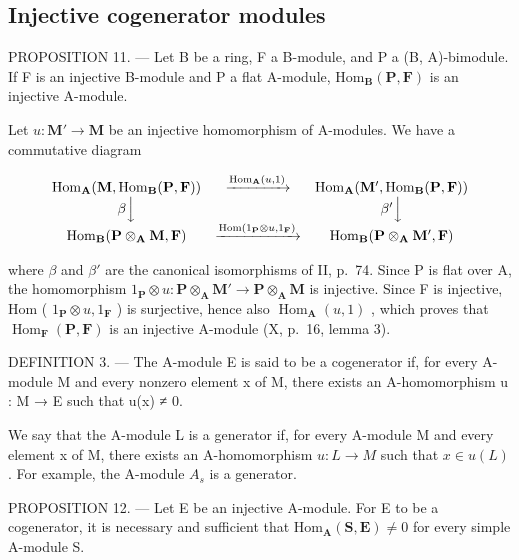 \subsection{Injective cogenerator modules}

PROPOSITION 11. --- Let B be a ring, F a B-module, and P a (B, A)-bimodule. If F is an injective B-module and P a flat A-module, \(\mathrm{Hom}_{\mathbf{B}}(\mathbf{P},\mathbf{F})\) is an injective A-module.

Let \(u: \mathbf{M}' \to \mathbf{M}\) be an injective homomorphism of A-modules. We have a commutative diagram

\[
\begin{array}{c c c} \operatorname{Hom} _ {\mathbf {A}} (\mathbf {M}, \operatorname{Hom} _ {\mathbf {B}} (\mathbf {P}, \mathbf {F})) & \xrightarrow {\operatorname{Hom} _ {\mathbf {A}} (u , 1)} & \operatorname{Hom} _ {\mathbf {A}} (\mathbf {M} ^ {\prime}, \operatorname{Hom} _ {\mathbf {B}} (\mathbf {P}, \mathbf {F})) \\ \beta \Big \downarrow & & \beta^ {\prime} \Big \downarrow \\ \operatorname{Hom} _ {\mathbf {B}} (\mathbf {P} \otimes_ {\mathbf {A}} \mathbf {M}, \mathbf {F}) & \xrightarrow {\operatorname{Hom} (1 _ {\mathbf {P}} \otimes u , 1 _ {\mathbf {F}})} & \operatorname{Hom} _ {\mathbf {B}} (\mathbf {P} \otimes_ {\mathbf {A}} \mathbf {M} ^ {\prime}, \mathbf {F}) \end{array}
\]

where \(\beta\) and \(\beta'\) are the canonical isomorphisms of II, p.~74. Since P is flat over A, the homomorphism \(1_{\mathbf{P}} \otimes u: \mathbf{P} \otimes_{\mathbf{A}} \mathbf{M}' \to \mathbf{P} \otimes_{\mathbf{A}} \mathbf{M}\) is injective. Since F is injective, Hom ( \(1_{\mathbf{P}} \otimes u, 1_{\mathbf{F}}\) ) is surjective, hence also \(\operatorname{Hom}_{\mathbf{A}}(u, 1)\) , which proves that \(\operatorname{Hom}_{\mathbf{F}}(\mathbf{P}, \mathbf{F})\) is an injective A-module (X, p.~16, lemma 3).

DEFINITION 3. --- The A-module E is said to be a cogenerator if, for every A-module M and every nonzero element x of M, there exists an A-homomorphism u : M → E such that u(x) ≠ 0.

We say that the A-module L is a generator if, for every A-module M and every element x of M, there exists an A-homomorphism \(u : L \to M\) such that \(x \in u(L)\) . For example, the A-module \(A_{s}\) is a generator.

PROPOSITION 12. --- Let E be an injective A-module. For E to be a cogenerator, it is necessary and sufficient that \(\mathrm{Hom}_{\mathbf{A}}(\mathbf{S},\mathbf{E})\neq 0\) for every simple A-module S.

